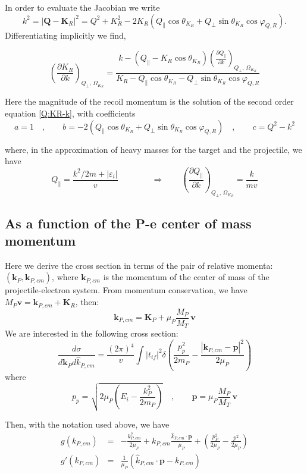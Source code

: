 In order to evaluate the Jacobian we write
%
\begin{equation}\label{Q:k-KR}
k^{2} = | \bm{Q} - \bm{K}_{R}| ^{2} = Q^{2} + K_{R}^{2} - 2 K_{R}
\left( Q_{\parallel } \cos{\theta_{K_{R}}} + Q_{\perp}
\sin{\theta_{K_{R}}} \cos{\varphi_{Q,R}}\right).
\end{equation}
%
Differentiating implicitly we find,

$$
\left( \frac{\partial K_{R}}{\partial k }\right)_{Q_{\perp},\,
  \Omega_{K_{R}}} =
\frac{ k - \left( Q_{\parallel } - K_{R} \cos{\theta_{K_{R}}}
\right)\displaystyle{ \left( \frac{\partial Q_{\parallel }}{\partial k
}\right)_{Q_{\perp},\, \Omega_{K_{R}}}}} {K_{R}- Q_{\parallel }
\cos{\theta_{K_{R}}} - Q_{\perp} \sin{\theta_{K_{R}}}
\cos{\varphi_{Q,R}} }
$$

\noindent
Here the magnitude of the recoil momentum is the solution of the second
order equation \ref{Q:KR-k}, with coefficients
$$
a=1 \quad  , \qquad b=-2 \left( Q_{\parallel } \cos{\theta_{K_{R}}} +
Q_{\perp} \sin{\theta_{K_{R}}} \cos{\varphi_{Q,R}}\right) \quad ,
\qquad c = Q^{2} - k^{2}
$$

  \noindent
where, in the approximation of heavy masses for the target and the
projectile, we have
$$
Q_{\parallel } = \frac{k^{2}/2m + | \varepsilon_{i}| }{v} \qquad
\qquad \Rightarrow \qquad \left( \frac{\partial Q_{\parallel
}}{\partial k }\right)_{Q_{\perp},\, \Omega_{K_{R}}} = \frac{k}{mv}
$$

\subsection{As a function of the P-e center of mass momentum}
\label{S:as-function-p}
Here we derive the cross section in terms of the pair of relative momenta: $(\bm{k}_{P}, \bm{k}_{P,cm})$, where $\bm{k}_{P,cm}$ is the momentum of the center of mass of the projectile-electron system.
From momentum conservation, we have $M_{P} \bm{v} = \bm{k}_{P,cm} + \bm{K}_{R}$, then:
$$
\bm{k}_{P,cm}= \bm{K}_{P} + \mu_{P}\frac{M_{P}}{M_{T}}\, \bm{v}
$$
We are interested in the following cross section:
$$
\frac{d \sigma}{d \bm{k}_{P} d \hat{k}_{P,cm}} = \frac{(2 \pi)^{4}}{v} \int |t_{if}|^{2} \delta \left( \frac{p_{p}^{2}}{2 m_{P}} - \frac{|\bm{k}_{P,cm} - \bm{p}|^{2}}{2 \mu_{P}} \right)
$$
%
where 
$$
p_{p}= \sqrt{2 \mu_{P}(E_{i}-\frac{k_{P}^{2}}{2 m_{P}})} \quad,\qquad \bm{p}=  \mu_{P}\frac{M_{P}}{M_{T}}\, \bm{v}
$$

Then, with the notation used above, we have
\begin{eqnarray*}
g(k_{P,cm})&=& - \frac{k_{P,cm}^{2}}{2 \mu_{P}} + k_{P,cm}\frac{\hat{k}_{P,cm} \cdot \bm{p}}{\mu_{P}} + \left( \frac{p_{P}^{2}}{2 \mu_{P}} - \frac{p^{2}}{2 \mu_{P}}\right) \\
g'(k_{P,cm})&=& \frac{1}{\mu_{P}}\left(  \hat{k}_{P,cm} \cdot \bm{p} - k_{P,cm} \right)
\end{eqnarray*}

